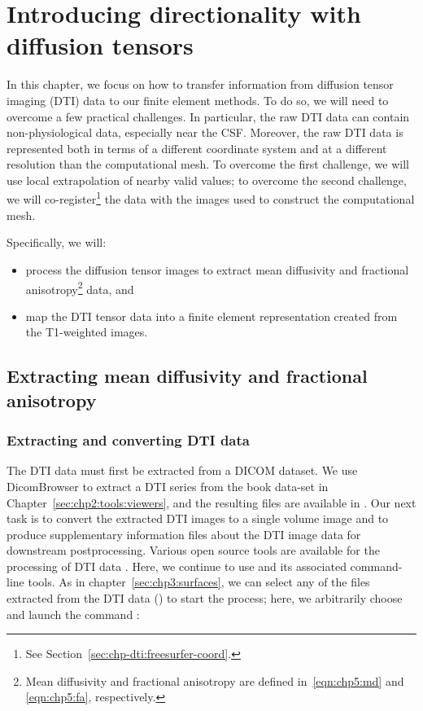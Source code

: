 \chapter{Introducing directionality with diffusion tensors}
\label{chap:dti}
 In this chapter, we focus on how to transfer information
from diffusion tensor imaging (DTI) data to our finite element
methods. To do so, we will need to overcome a few practical
challenges. In particular, the raw DTI data can contain
non-physiological data, especially near the CSF. Moreover, the raw DTI
data is represented both in terms of a different coordinate system and
at a different resolution than the computational mesh. To overcome the
first challenge, we will use local extrapolation of nearby valid
values; to overcome the second challenge, we will
co-register\footnote{See Section~\ref{sec:chp-dti:freesurfer-coord}.}
the data with the images used to construct the computational mesh.

Specifically, we will:
\begin{itemize}
\item
  process the diffusion tensor images to extract mean diffusivity and
  fractional anisotropy\footnote{Mean diffusivity and fractional 
  anisotropy are defined in~\eqref{eqn:chp5:md} and 
  \eqref{eqn:chp5:fa}, respectively.} data, and
\item
  map the DTI tensor data into a finite element representation created from
  the T1-weighted images.
\end{itemize}

\section{Extracting mean diffusivity and fractional anisotropy}

\subsection{Extracting and converting DTI data}
\label{sec:chp-dti:extract-and-convert}
The DTI data must first be extracted from a DICOM dataset. We use
DicomBrowser to extract a DTI series from the book data-set in
Chapter~\ref{sec:chp2:tools:viewers}, and the resulting files are
available in . Our next task is to convert the
extracted DTI images to a single volume image and to produce
supplementary information files about the DTI image data for
downstream postprocessing. Various open source tools are available
for the processing of DTI data \cite{soares2013hitchhiker}. Here, we
continue to use \freesurfer{} and its associated command-line tools. 
As in chapter~\ref{sec:chp3:surfaces}, we can select any of the files 
extracted from the  DTI data () to start 
the process; here, we arbitrarily choose  and launch the 
{\freesurfer} command :

